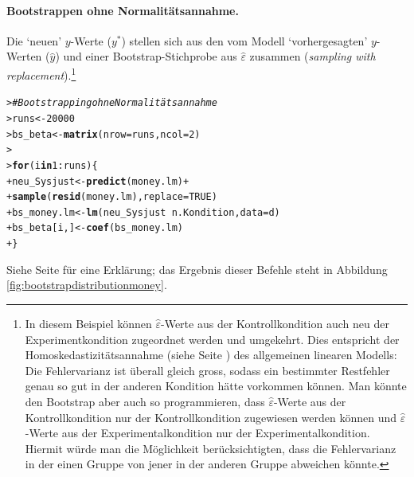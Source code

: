 \documentclass[oneside, 10pt]{book}\usepackage[]{graphicx}\usepackage[]{xcolor}
\makeatletter
\newcommand{\hlnum}[1]{\textcolor[rgb]{0.686,0.059,0.569}{#1}}%
\newcommand{\hlcom}[1]{\textcolor[rgb]{0.678,0.584,0.686}{\textit{#1}}}%
\newcommand{\hlopt}[1]{\textcolor[rgb]{0,0,0}{#1}}%
\newcommand{\hlstd}[1]{\textcolor[rgb]{0.345,0.345,0.345}{#1}}%
\newcommand{\hlkwa}[1]{\textcolor[rgb]{0.161,0.373,0.58}{\textbf{#1}}}%
\newcommand{\hlkwb}[1]{\textcolor[rgb]{0.69,0.353,0.396}{#1}}%
\newcommand{\hlkwc}[1]{\textcolor[rgb]{0.333,0.667,0.333}{#1}}%
\newcommand{\hlkwd}[1]{\textcolor[rgb]{0.737,0.353,0.396}{\textbf{#1}}}%
\newenvironment{kframe}{%
 \def\at@end@of@kframe{}%
 \ifinner\ifhmode%
  \def\at@end@of@kframe{\end{minipage}}%
  \begin{minipage}{\columnwidth}%
 \fi\fi%
 \def\FrameCommand##1{\hskip\@totalleftmargin \hskip-\fboxsep
 \colorbox{shadecolor}{##1}\hskip-\fboxsep
     \hskip-\linewidth \hskip-\@totalleftmargin \hskip\columnwidth}%
 \MakeFramed {\advance\hsize-\width
   \@totalleftmargin\z@ \linewidth\hsize
   \@setminipage}}%
 {\par\unskip\endMakeFramed%
 \at@end@of@kframe}
\newenvironment{knitrout}{}{} %
\makeatother
\begin{document}
\paragraph{Bootstrappen ohne Normalitätsannahme.}
Die `neuen' $y$-Werte ($y^{*}$)
stellen sich aus den vom Modell `vorhergesagten' $y$-Werten ($\widehat{y}$)
und einer Bootstrap-Stichprobe aus $\widehat{\varepsilon}$ zusammen
(\textit{sampling with replacement}).\footnote{In diesem Beispiel können
$\widehat{\varepsilon}$-Werte aus der Kontrollkondition auch neu der Experimentkondition
zugeordnet werden und umgekehrt. Dies entspricht der Homoskedastizitätsannahme
(siehe Seite \pageref{homoskedasticity}) des allgemeinen linearen Modells:
Die Fehlervarianz ist überall gleich gross, sodass ein bestimmter
Restfehler genau so gut in der anderen Kondition hätte vorkommen können.
Man könnte den Bootstrap aber auch so programmieren, dass $\widehat{\varepsilon}$-Werte
aus der Kontrollkondition nur der Kontrollkondition zugewiesen werden können
und $\widehat{\varepsilon}$-Werte aus der Experimentalkondition nur der Experimentalkondition.
Hiermit würde man die Möglichkeit berücksichtigten,
dass die Fehlervarianz in der einen Gruppe von jener in der
anderen Gruppe abweichen könnte.}
\begin{knitrout}
\color{fgcolor}\begin{kframe}
\begin{alltt}
\hlstd{> }\hlcom{# Bootstrapping ohne Normalitätsannahme}
\hlstd{> }\hlstd{runs} \hlkwb{<-} \hlnum{20000}
\hlstd{> }\hlstd{bs_beta} \hlkwb{<-} \hlkwd{matrix}\hlstd{(}\hlkwc{nrow} \hlstd{= runs,} \hlkwc{ncol} \hlstd{=} \hlnum{2}\hlstd{)}
\hlstd{> }
\hlstd{> }\hlkwa{for} \hlstd{(i} \hlkwa{in} \hlnum{1}\hlopt{:}\hlstd{runs) \{}
\hlstd{+ }  \hlstd{neu_Sysjust} \hlkwb{<-} \hlkwd{predict}\hlstd{(money.lm)} \hlopt{+}
\hlstd{+ }    \hlkwd{sample}\hlstd{(}\hlkwd{resid}\hlstd{(money.lm),} \hlkwc{replace} \hlstd{=} \hlnum{TRUE}\hlstd{)}
\hlstd{+ }  \hlstd{bs_money.lm} \hlkwb{<-} \hlkwd{lm}\hlstd{(neu_Sysjust} \hlopt{~} \hlstd{n.Kondition,} \hlkwc{data} \hlstd{= d)}
\hlstd{+ }  \hlstd{bs_beta[i, ]} \hlkwb{<-} \hlkwd{coef}\hlstd{(bs_money.lm)}
\hlstd{+ }\hlstd{\}}
\end{alltt}
\end{kframe}
\end{knitrout}
Siehe Seite \pageref{sec:histogrammebootstrapdekeyser} für eine Erklärung;
das Ergebnis dieser Befehle steht in Abbildung \ref{fig:bootstrapdistributionmoney}.
\end{document}

